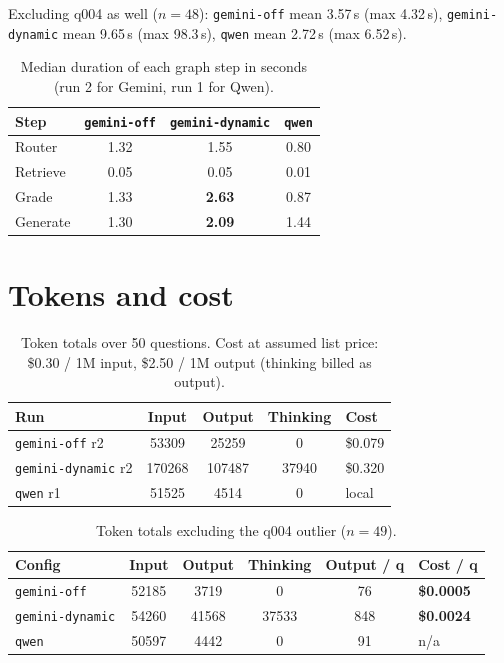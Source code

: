 \documentclass[11pt]{article}
\newcommand{\cfg}[1]{\texttt{#1}}
\begin{document}
Excluding q004 as well ($n=48$): \cfg{gemini-off} mean 3.57\,s (max 4.32\,s),
\cfg{gemini-dynamic} mean 9.65\,s (max 98.3\,s), \cfg{qwen} mean 2.72\,s (max 6.52\,s).

\begin{table}[h]
\centering
\caption{Median duration of each graph step in seconds (run 2 for Gemini, run 1 for Qwen).}
\label{tab:steps}
\begin{tabular}{@{}lccc@{}}
\toprule
Step & \cfg{gemini-off} & \cfg{gemini-dynamic} & \cfg{qwen} \\
\midrule
Router   & 1.32 & 1.55          & 0.80 \\
Retrieve & 0.05 & 0.05          & 0.01 \\
Grade    & 1.33 & \textbf{2.63} & 0.87 \\
Generate & 1.30 & \textbf{2.09} & 1.44 \\
\bottomrule
\end{tabular}
\end{table}

\section{Tokens and cost}

\begin{table}[h]
\centering
\caption{Token totals over 50 questions. Cost at assumed list price: \$0.30 / 1M input, \$2.50 / 1M output (thinking billed as output).}
\label{tab:tokens-all}
\begin{tabular}{@{}lS[table-format=6.0]S[table-format=6.0]S[table-format=5.0]l@{}}
\toprule
Run & {Input} & {Output} & {Thinking} & Cost \\
\midrule
\cfg{gemini-off} r2     & 53309  & 25259  & 0     & \$0.079 \\
\cfg{gemini-dynamic} r2 & 170268 & 107487 & 37940 & \$0.320 \\
\cfg{qwen} r1           & 51525  & 4514   & 0     & local \\
\bottomrule
\end{tabular}
\end{table}

\begin{table}[h]
\centering
\caption{Token totals excluding the q004 outlier ($n=49$).}
\label{tab:tokens-ex}
\begin{tabular}{@{}lS[table-format=5.0]S[table-format=5.0]S[table-format=5.0]S[table-format=3.0]l@{}}
\toprule
Config & {Input} & {Output} & {Thinking} & {Output / q} & Cost / q \\
\midrule
\cfg{gemini-off}     & 52185 & 3719  & 0     & 76  & \textbf{\$0.0005} \\
\cfg{gemini-dynamic} & 54260 & 41568 & 37533 & 848 & \textbf{\$0.0024} \\
\cfg{qwen}           & 50597 & 4442  & 0     & 91  & n/a \\
\bottomrule
\end{tabular}
\end{table}
\end{document}
